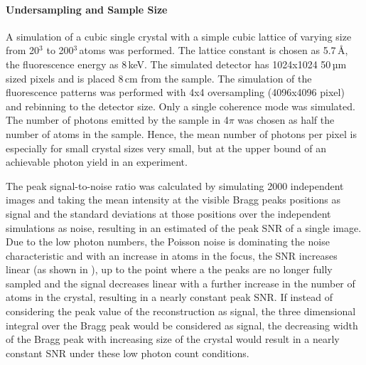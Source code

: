 
\paragraph{Undersampling and  Sample Size}


A simulation of a cubic single crystal with a simple cubic lattice of varying size from 20$^3$ to 200$^3$\,atoms was performed. The lattice constant is chosen as 5.7\,\AA, the fluorescence energy as 8\,keV. The simulated detector has 1024x1024 50\,µm sized pixels and is placed 8\,cm from the  sample. The simulation of the fluorescence patterns was performed with 4x4 oversampling (4096x4096 pixel) and rebinning to the detector size. Only a single coherence mode was simulated. The number of photons emitted by the sample in 4$\pi$ was chosen as half the number of atoms in the sample. Hence, the mean number of photons per pixel is especially for small crystal sizes very small, but at the upper bound of an achievable photon yield in an experiment.

The peak signal-to-noise ratio was calculated by simulating 2000 independent images  and taking the mean intensity at the visible Bragg peaks positions as signal and the standard deviations at those positions over the independent simulations as noise, resulting in an estimated of the peak SNR of a single image.
Due to the low photon numbers, the Poisson noise is dominating the noise characteristic and with an increase in atoms in the focus, the SNR increases linear (as shown in ), up to the point where a the peaks are no longer fully sampled and the signal decreases linear with a further increase in the number of atoms in the crystal, resulting in a nearly constant peak SNR.
If instead of considering the peak value of the reconstruction as signal, the three dimensional integral over the Bragg peak would be considered as signal, the decreasing width of the Bragg peak with increasing size of the crystal would result in a nearly constant SNR under these low photon count conditions. 



